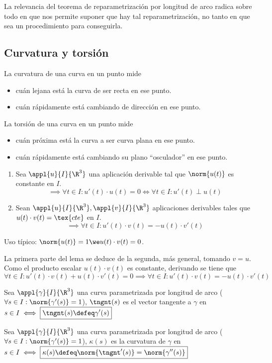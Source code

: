 La relevancia del teorema de reparametrización por longitud de arco radica sobre todo en que nos permite suponer que hay tal reparametrización, no tanto en que sea un procedimiento para conseguirla.

\subsection{Curvatura y torsión}
La curvatura de una curva en un punto mide
\begin{itemize}[topsep=1pt, itemsep=1pt,parsep=3pt]
	\item cuán lejana está la curva de ser recta en ese punto.
	\item cuán rápidamente está cambiando de dirección en ese punto.
\end{itemize}
La torsión de una curva en un punto mide
\begin{itemize}[topsep=1pt, itemsep=1pt,parsep=3pt]
	\item cuán próxima está la curva a ser curva plana en ese punto.
	\item cuán rápidamente está cambiando su plano “osculador” en ese punto.
\end{itemize}
\begin{lem}
	\begin{enumerate}[topsep=0pt, itemsep=1pt,parsep=3pt]
		\item Sea $\appl{u}{I}{\R^3}$ una aplicación derivable tal que $\norm{u(t)}$ es constante en $I$.
		      \[\implies \forall t \in I : u'(t)\cdot u(t)=0 \iff \forall t \in I : u'(t) \perp u(t)\]
		\item Sean $\appl{u}{I}{\R^3}, \appl{v}{I}{\R^3}$ aplicaciones derivables tales que $u(t)\cdot v(t)=\tex{cte}$ en $I$.
		      \[\implies \forall t \in I : u'(t) \cdot v(t)=-u(t)\cdot v'(t)\]
	\end{enumerate}
	Uso típico: $\norm{u(t)}=1 \we u(t)\cdot v(t)=0$.
	\begin{dem}
		La primera parte del lema se deduce de la segunda, más general, tomando $v=u$.
		Como el producto escalar $u(t)\cdot v(t)$ es constante, derivando se tiene que
		\[\forall t \in I : u'(t)\cdot v(t) + u(t)\cdot v'(t) = 0 \implies \forall t \in I : u'(t)\cdot v(t) = - u(t)\cdot v'(t)\]
	\end{dem}
\end{lem}
\begin{defn}
	Sea $\appl{\gamma}{I}{\R^3}$ una curva parametrizada por longitud de arco ($\forall s \in I : \norm{\gamma'(s)}=1$), $\tngnt(s)$ es el vector tangente a $\gamma$ en $s\in I \iff \boxed{\tngnt(s)\defeq \gamma'(s)}$
\end{defn}
\begin{defn}[Curvatura] \label{defnCurvatura}
	Sea $\appl{\gamma}{I}{\R^3}$ una curva parametrizada por longitud de arco ($\forall s \in I : \norm{\gamma'(s)}=1$), $\kappa(s)$ es la curvatura de $\gamma$ en $s \in I \iff \boxed{\kappa(s) \defeq \norm{\tngnt'(s)}=\norm{\gamma''(s)}}$
\end{defn}

